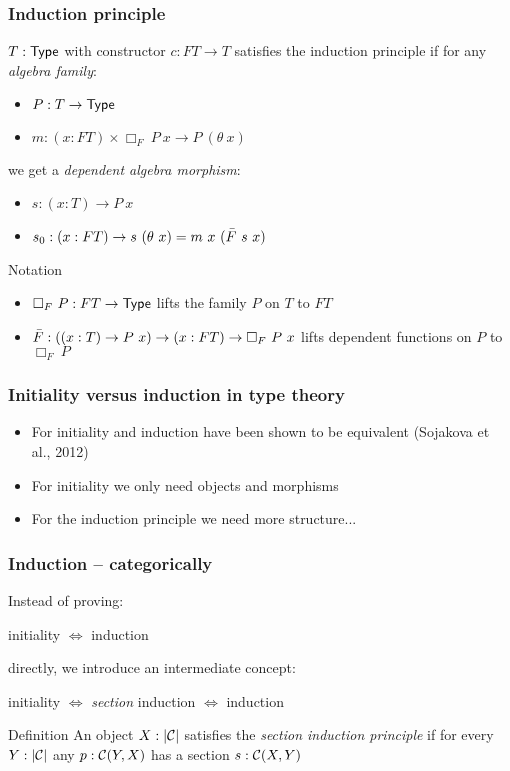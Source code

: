 \documentclass{beamer}
\begin{document}
\begin{frame}
  \frametitle{Induction principle}
  $T : \mathsf{Type}$ with constructor $c : FT \to T$ satisfies the
  induction principle if for any \emph{algebra family}:

  \begin{itemize}
  \item $P : T \to \mathsf{Type}$
  \item $m : (x : FT) \times \Box_F\ P\ x \to P\ (\theta\ x)$
  \end{itemize}

  we get a \emph{dependent algebra morphism}:

  \begin{itemize}
  \item $s : (x : T) \to P\ x$
  \item $s_0 : (x : FT) \to s\ (\theta\ x) = m\ x\ (\actionsection{F}\ s\ x)$
  \end{itemize}

  \begin{block}{Notation}
    \begin{itemize}
    \item $\Box_F\ P : FT \to \mathsf{Type}$ lifts the family $P$ on $T$ to
      $FT$
    \item
      $\bar{F} : ((x : T) \to P\ x) \to (x : FT) \to \Box_F\
      P\ x$ lifts dependent functions on $P$ to $\Box_F\ P$
    \end{itemize}
  \end{block}
\end{frame}

\begin{frame}
  \frametitle{Initiality versus induction in type theory}
  \begin{itemize}
  \item For \oits initiality and induction have been shown to be
    equivalent (Sojakova et al., 2012)
  \item For initiality we only need objects and morphisms
  \item For the induction principle we need more structure...
  \end{itemize}
\end{frame}

\begin{frame}
  \frametitle{Induction -- categorically}
  Instead of proving:
  \begin{center}
    initiality $\iff$ induction
  \end{center}
  directly, we introduce an intermediate concept:
  \begin{center}
    initiality $\iff$ \emph{section} induction $\iff$ induction
  \end{center}
  \hfill

  \begin{block}{Definition}
    An object $X : | \mathcal{C} |$ satisfies the \emph{section induction
      principle} if for every $Y : | \mathcal{C} |$ any $p : \mathcal{C}(Y,X)$ has a
    section $s : \mathcal{C}(X,Y)$
  \end{block}
\end{frame}
\end{document}
